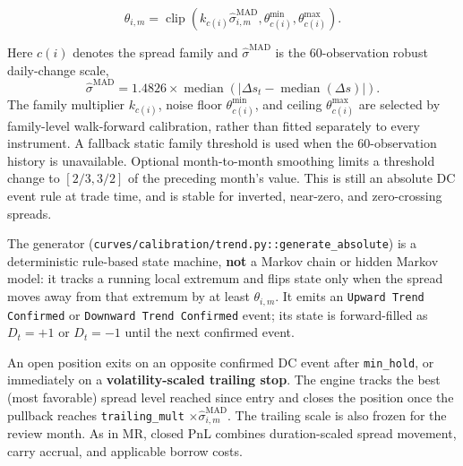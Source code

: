 \begin{equation}
\theta_{i,m}=\operatorname{clip}\!\left(k_{c(i)}\hat{\sigma}^{\mathrm{MAD}}_{i,m},
\theta^{\min}_{c(i)},\theta^{\max}_{c(i)}\right).
\end{equation}

Here $c(i)$ denotes the spread family and $\hat{\sigma}^{\mathrm{MAD}}$ is the
60-observation robust daily-change scale,
\begin{equation}
\hat{\sigma}^{\mathrm{MAD}}=1.4826\times
\operatorname{median}\!\left(\left|\Delta s_t-
\operatorname{median}(\Delta s)\right|\right).
\end{equation}
The family multiplier $k_{c(i)}$, noise floor $\theta^{\min}_{c(i)}$, and ceiling
$\theta^{\max}_{c(i)}$ are selected by family-level walk-forward calibration, rather
than fitted separately to every instrument. A fallback static family threshold is
used when the 60-observation history is unavailable. Optional month-to-month
smoothing limits a threshold change to $[2/3,3/2]$ of the preceding month's value.
This is still an absolute DC event rule at trade time, and is stable for inverted,
near-zero, and zero-crossing spreads.

The generator (\texttt{curves/calibration/trend.py::generate\_absolute}) is a
deterministic rule-based state machine, \textbf{not} a Markov chain or hidden Markov
model: it tracks a running local extremum and flips state only when the spread moves
away from that extremum by at least $\theta_{i,m}$. It emits an \texttt{Upward Trend
Confirmed} or \texttt{Downward Trend Confirmed} event; its state is forward-filled as
$D_t=+1$ or $D_t=-1$ until the next confirmed event.

An open position exits on an opposite confirmed DC event after \texttt{min\_hold}, or
immediately on a \textbf{volatility-scaled trailing stop}. The engine tracks the best
(most favorable) spread level reached since entry and closes the position once the
pullback reaches \texttt{trailing\_mult} $\times\hat{\sigma}^{\mathrm{MAD}}_{i,m}$.
The trailing scale is also frozen for the review month. As in MR, closed PnL combines
duration-scaled spread movement, carry accrual, and applicable borrow costs.

